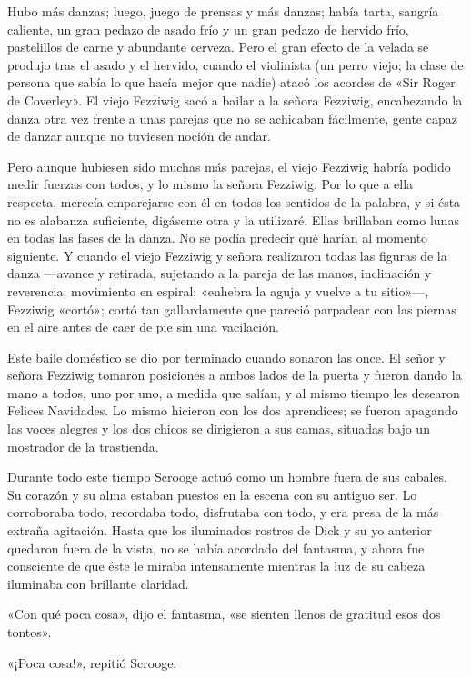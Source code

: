 \documentclass{novela}
\begin{document}
 Hubo más danzas; luego, juego de prensas y más danzas; había tarta, sangría caliente, un gran pedazo de asado frío y un gran pedazo de hervido frío, pastelillos de carne y abundante cerveza. Pero el gran efecto de la velada se produjo tras el asado y el hervido, cuando el violinista (un perro viejo; la clase de persona que sabía lo que hacía mejor que nadie) atacó los acordes de «Sir Roger de Coverley». El viejo Fezziwig sacó a bailar a la señora Fezziwig, encabezando la danza otra vez frente a unas parejas que no se achicaban fácilmente, gente capaz de danzar aunque no tuviesen noción de andar.

 Pero aunque hubiesen sido muchas más parejas, el viejo Fezziwig habría podido medir fuerzas con todos, y lo mismo la señora Fezziwig. Por lo que a ella respecta, merecía emparejarse con él en todos los sentidos de la palabra, y si ésta no es alabanza suficiente, digáseme otra y la utilizaré. Ellas brillaban como lunas en todas las fases de la danza. No se podía predecir qué harían al momento siguiente. Y cuando el viejo Fezziwig y señora realizaron todas las figuras de la danza ---avance y retirada, sujetando a la pareja de las manos, inclinación y reverencia; movimiento en espiral; «enhebra la aguja y vuelve a tu sitio»---, Fezziwig «cortó»; cortó tan gallardamente que pareció parpadear con las piernas en el aire antes de caer de pie sin una vacilación.

 Este baile doméstico se dio por terminado cuando sonaron las once. El señor y señora Fezziwig tomaron posiciones a ambos lados de la puerta y fueron dando la mano a todos, uno por uno, a medida que salían, y al mismo tiempo les desearon Felices Navidades. Lo mismo hicieron con los dos aprendices; se fueron apagando las voces alegres y los dos chicos se dirigieron a sus camas, situadas bajo un mostrador de la trastienda.

 Durante todo este tiempo Scrooge actuó como un hombre fuera de sus cabales. Su corazón y su alma estaban puestos en la escena con su antiguo ser. Lo corroboraba todo, recordaba todo, disfrutaba con todo, y era presa de la más extraña agitación. Hasta que los iluminados rostros de Dick y su yo anterior quedaron fuera de la vista, no se había acordado del fantasma, y ahora fue consciente de que éste le miraba intensamente mientras la luz de su cabeza iluminaba con brillante claridad.

 «Con qué poca cosa», dijo el fantasma, «se sienten llenos de gratitud esos dos tontos».

 «¡Poca cosa!», repitió Scrooge.
\end{document}
